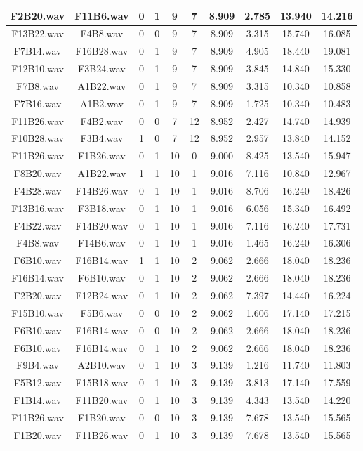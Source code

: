 \documentclass[11pt,a4paper]{book}
\begin{document}
\begin{longtable}[c]{|c|c|c|c|c|c|c|c|c|c|}
F2B20.wav&F11B6.wav&0&1&9&7&8.909&2.785&13.940&14.216\\ \hline
F13B22.wav&F4B8.wav&0&0&9&7&8.909&3.315&15.740&16.085\\ \hline
F7B14.wav&F16B28.wav&0&1&9&7&8.909&4.905&18.440&19.081\\ \hline
F12B10.wav&F3B24.wav&0&1&9&7&8.909&3.845&14.840&15.330\\ \hline
F7B8.wav&A1B22.wav&0&1&9&7&8.909&3.315&10.340&10.858\\ \hline
F7B16.wav&A1B2.wav&0&1&9&7&8.909&1.725&10.340&10.483\\ \hline
F11B26.wav&F4B2.wav&0&0&7&12&8.952&2.427&14.740&14.939\\ \hline
F10B28.wav&F3B4.wav&1&0&7&12&8.952&2.957&13.840&14.152\\ \hline
F11B26.wav&F1B26.wav&0&1&10&0&9.000&8.425&13.540&15.947\\ \hline
F8B20.wav&A1B22.wav&1&1&10&1&9.016&7.116&10.840&12.967\\ \hline
F4B28.wav&F14B26.wav&0&1&10&1&9.016&8.706&16.240&18.426\\ \hline
F13B16.wav&F3B18.wav&0&1&10&1&9.016&6.056&15.340&16.492\\ \hline
F4B22.wav&F14B20.wav&0&1&10&1&9.016&7.116&16.240&17.731\\ \hline
F4B8.wav&F14B6.wav&0&1&10&1&9.016&1.465&16.240&16.306\\ \hline
F6B10.wav&F16B14.wav&1&1&10&2&9.062&2.666&18.040&18.236\\ \hline
F16B14.wav&F6B10.wav&0&1&10&2&9.062&2.666&18.040&18.236\\ \hline
F2B20.wav&F12B24.wav&0&1&10&2&9.062&7.397&14.440&16.224\\ \hline
F15B10.wav&F5B6.wav&0&0&10&2&9.062&1.606&17.140&17.215\\ \hline
F6B10.wav&F16B14.wav&0&0&10&2&9.062&2.666&18.040&18.236\\ \hline
F6B10.wav&F16B14.wav&0&1&10&2&9.062&2.666&18.040&18.236\\ \hline
F9B4.wav&A2B10.wav&0&1&10&3&9.139&1.216&11.740&11.803\\ \hline
F5B12.wav&F15B18.wav&0&1&10&3&9.139&3.813&17.140&17.559\\ \hline
F1B14.wav&F11B20.wav&0&1&10&3&9.139&4.343&13.540&14.220\\ \hline
F11B26.wav&F1B20.wav&0&0&10&3&9.139&7.678&13.540&15.565\\ \hline
F1B20.wav&F11B26.wav&0&1&10&3&9.139&7.678&13.540&15.565\\ \hline

\end{longtable}
\end{document}

